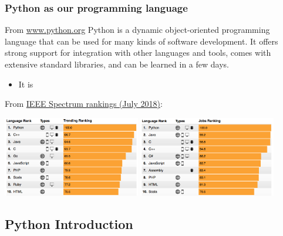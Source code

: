 \documentclass[hyperref={colorlinks=true}]{beamer}
\begin{document}
\begin{frame}%
  \frametitle{Python as our programming language}
    
  \begin{ucblock}{From \url{www.python.org}}
    Python is a dynamic object-oriented programming language that can be used for many kinds of software development. It offers strong support for integration with other languages and tools, comes with extensive standard libraries, and can be learned in a few days.
  \end{ucblock}
  
  
  \begin{itemize}
    \item It is 
  \end{itemize}
    
  From \href{https://spectrum.ieee.org/static/interactive-the-top-programming-languages-2018}{IEEE Spectrum rankings (July 2018)}:

  \begin{center}
    \includegraphics[width=0.45\textwidth]{Python-Trending.png}
    \includegraphics[width=0.45\textwidth]{Python-Jobs.png}
  \end{center}  
    
\end{frame}

\subsection[Python Introduction]{Python Introduction}
\end{document}
